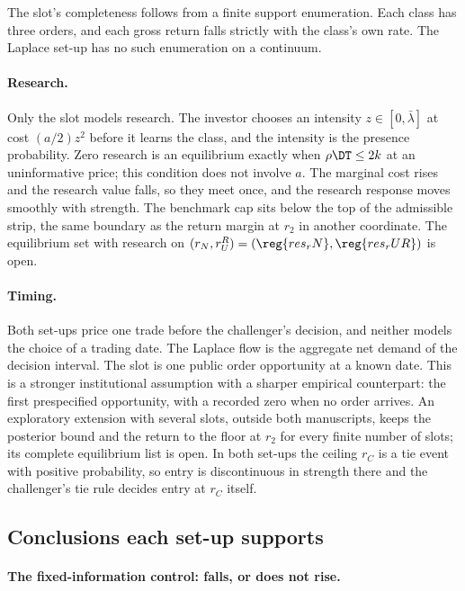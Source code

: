 The slot's completeness follows from a finite support enumeration. Each class has three orders, and each gross
return falls strictly with the class's own rate. The Laplace set-up has no such enumeration on a continuum.

\paragraph{Research.}
Only the slot models research. The investor chooses an intensity \(z\in[0,\bar\lambda]\) at cost \((a/2)z^2\)
before it learns the class, and the intensity is the presence probability. Zero research is an equilibrium
exactly when \(\rho\DT\le2k\) at an uninformative price; this condition does not involve \(a\). The marginal
cost rises and the research value falls, so they meet once, and the research response moves smoothly with
strength. The benchmark cap sits  below the top of the admissible strip, the same
boundary as the return margin at \(r_2\) in another coordinate. The equilibrium set with research on
\((r_N,r_U^R)=(\reg{res_rN},\reg{res_rUR})\) is open.

\paragraph{Timing.}
Both set-ups price one trade before the challenger's decision, and neither models the choice of a trading
date. The Laplace flow is the aggregate net demand of the decision interval. The slot is one public order
opportunity at a known date. This is a stronger institutional assumption with a sharper empirical counterpart:
the first prespecified opportunity, with a recorded zero when no order arrives. An exploratory extension with
several slots, outside both manuscripts, keeps the posterior bound and the return to the floor at \(r_2\) for
every finite number of slots; its complete equilibrium list is open. In both set-ups the ceiling \(r_C\) is a
tie event with positive probability, so entry is discontinuous in strength there and the challenger's tie rule
decides entry at \(r_C\) itself.

\subsection{Conclusions each set-up supports}\label{sec:conclusions}

\paragraph{The fixed-information control: falls, or does not rise.}


